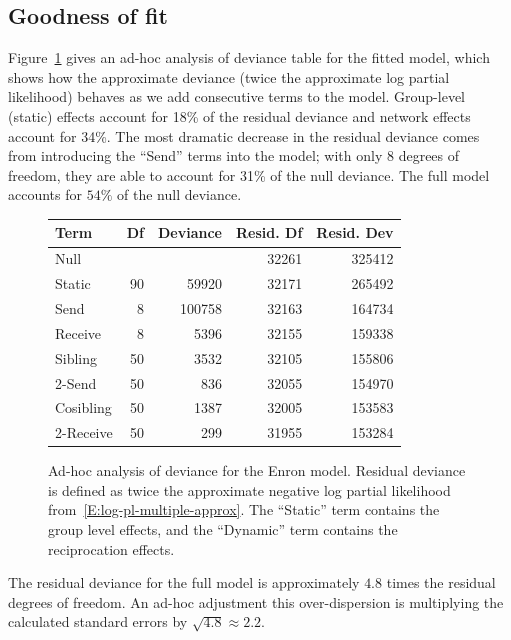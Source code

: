 \documentclass[final]{statsoc}
\begin{document}
\subsection{Goodness of fit}\label{S:enron-goodness}


Figure~\ref{F:deviance} gives an ad-hoc analysis of deviance table for the
fitted model, which shows how the approximate deviance (twice the approximate
log partial likelihood) behaves as we add consecutive terms to the model.
Group-level (static) effects account for 18\% of the residual deviance and
network effects account for 34\%.  The most dramatic decrease in the residual
deviance comes from introducing the ``Send'' terms into the model; with only 8
degrees of freedom, they are able to account for 31\% of the null deviance.
The full model accounts for $54\%$ of the null deviance.



\begin{figure}[h]
\centering
\begin{tabular}{lrrrr}
    \toprule
    \textbf{Term}
        & \textbf{Df}
        & \textbf{Deviance}
        & \textbf{Resid. Df}
        & \textbf{Resid. Dev} \\
    \midrule
    Null &  &  & 32261 & 325412 \\
    Static & 90 & 59920 & 32171 & 265492 \\
    Send & 8 & 100758 & 32163 & 164734 \\
    Receive & 8 & 5396 & 32155 & 159338 \\
    Sibling & 50 & 3532 & 32105 & 155806 \\
    2-Send & 50 & 836 & 32055 & 154970 \\
    Cosibling & 50 & 1387 & 32005 & 153583 \\
    2-Receive & 50 & 299 & 31955 & 153284 \\
    \bottomrule
\end{tabular}
    \caption{
        Ad-hoc analysis of deviance for the Enron model.  Residual deviance
        is defined as twice the approximate negative log partial likelihood
        from~\eqref{E:log-pl-multiple-approx}.
        The ``Static'' term contains the group level effects, and the
        ``Dynamic'' term contains the reciprocation effects.
    }
    \label{F:deviance}
\end{figure}

The residual deviance for the full model is approximately $4.8$ times the
residual degrees of freedom.  An ad-hoc adjustment this over-dispersion 
is multiplying the calculated standard errors by $\sqrt{4.8} \approx 2.2$.  
\end{document}
